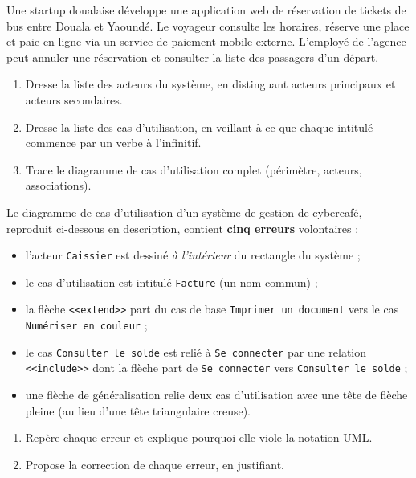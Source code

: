 \documentclass[11pt]{article}
\begin{document}
\begin{exercice}
Une startup doualaise développe une application web de réservation de tickets de bus entre Douala et Yaoundé. Le voyageur consulte les horaires, réserve une place et paie en ligne via un service de paiement mobile externe. L'employé de l'agence peut annuler une réservation et consulter la liste des passagers d'un départ.
\begin{enumerate}
\item Dresse la liste des acteurs du système, en distinguant acteurs principaux et acteurs secondaires.
\item Dresse la liste des cas d'utilisation, en veillant à ce que chaque intitulé commence par un verbe à l'infinitif.
\item Trace le diagramme de cas d'utilisation complet (périmètre, acteurs, associations).
\end{enumerate}
\end{exercice}

\begin{exercice}
Le diagramme de cas d'utilisation d'un système de gestion de cybercafé, reproduit ci-dessous en description, contient \textbf{cinq erreurs} volontaires :
\begin{itemize}
\item l'acteur \texttt{Caissier} est dessiné \emph{à l'intérieur} du rectangle du système ;
\item le cas d'utilisation est intitulé \texttt{Facture} (un nom commun) ;
\item la flèche \texttt{<<extend>>} part du cas de base \texttt{Imprimer un document} vers le cas \texttt{Numériser en couleur} ;
\item le cas \texttt{Consulter le solde} est relié à \texttt{Se connecter} par une relation \texttt{<<include>>} dont la flèche part de \texttt{Se connecter} vers \texttt{Consulter le solde} ;
\item une flèche de généralisation relie deux cas d'utilisation avec une tête de flèche pleine (au lieu d'une tête triangulaire creuse).
\end{itemize}
\begin{enumerate}
\item Repère chaque erreur et explique pourquoi elle viole la notation UML.
\item Propose la correction de chaque erreur, en justifiant.
\end{enumerate}
\end{exercice}
\end{document}
